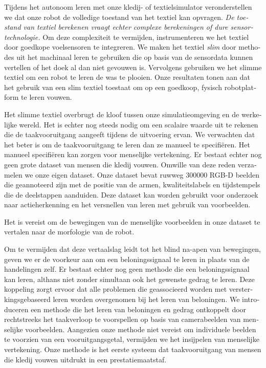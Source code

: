 \documentclass[\home/main.tex]{subfiles}
\begin{document}
\begin{otherlanguage}{dutch}
Tijdens het autonoom leren met onze kledij- of textielsimulator veronderstellen we dat onze robot de volledige toestand van het textiel kan opvragen. \emph{De toestand van textiel berekenen vraagt echter complexe berekeningen of dure sensortechnologie.} Om deze complexiteit te vermijden, instrumenteren we het textiel door goedkope voelsensoren te integreren. We maken het textiel \textit{slim} door methodes uit het machinaal leren te gebruiken die op basis van de sensordata kunnen vertellen of het doek al dan niet gevouwen is. Vervolgens gebruiken we het slimme textiel om een robot te leren de was te plooien. Onze resultaten tonen aan dat het gebruik van een slim textiel toestaat om op een goedkoop, fysisch robotplatform te leren vouwen.

Het slimme textiel overbrugt de kloof tussen onze simulatieomgeving en de werkelijke wereld. Het is echter nog steeds nodig om een scalaire waarde uit te rekenen die de taakvooruitgang aangeeft tijdens de uitvoering ervan.
We verwachten dat het beter is om de taakvooruitgang te leren dan ze manueel te specifiëren. Het manueel specifiëren kan zorgen voor menselijke vertekening.  
Er bestaat echter nog geen grote dataset van mensen die kledij vouwen. Omwille van deze reden verzamelen we onze eigen dataset. Onze dataset bevat ruwweg \qty{300000}{} RGB-D beelden die geannoteerd zijn met de positie van de armen, kwaliteitslabels en tijdstempels die de deelstappen aanduiden. Deze dataset kan worden gebruikt voor onderzoek naar actieherkenning en het versnellen van leren met gebruik van voorbeelden.

Het is vereist om de bewegingen van de menselijke voorbeelden in onze dataset te vertalen naar de morfologie van de robot. 

Om te vermijden dat deze vertaalslag leidt tot het blind na-apen van bewegingen, geven we er de voorkeur aan om een beloningssignaal te leren in plaats van de handelingen zelf.
Er bestaat echter nog geen methode die een beloningssignaal kan leren, althans niet zonder simultaan ook het gewenste gedrag te leren. Deze koppeling zorgt ervoor dat alle problemen die geassocieerd worden met versterkingsgebaseerd leren worden overgenomen bij het leren van beloningen. 
We introduceren een methode die het leren van beloningen en gedrag ontkoppelt door rechtstreeks het taakverloop te voorspellen op basis van camerabeelden van menselijke voorbeelden. Aangezien onze methode niet vereist om individuele beelden te voorzien van een vooruitgangsgetal, vermijden we het insijpelen van menselijke vertekening. Onze methode is het eerste systeem dat taakvooruitgang van mensen die kledij vouwen uitdrukt in een prestatiemaatstaf. 


\end{otherlanguage}
\end{document}
